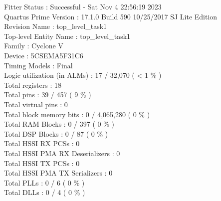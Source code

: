\documentclass[11pt, titlepage]{article}
\begin{document}
\begin{description}
                    Fitter Status : Successful - Sat Nov  4 22:56:19 2023 \\
                    Quartus Prime Version : 17.1.0 Build 590 10/25/2017 SJ Lite Edition \\
                    Revision Name : top\_level\_task1 \\
                    Top-level Entity Name : top\_level\_task1 \\
                    Family : Cyclone V \\
                    Device : 5CSEMA5F31C6 \\
                    Timing Models : Final \\
                    Logic utilization (in ALMs) : 17 / 32,070 ( < 1 \% ) \\
                    Total registers : 18 \\
                    Total pins : 39 / 457 ( 9 \% ) \\
                    Total virtual pins : 0 \\
                    Total block memory bits : 0 / 4,065,280 ( 0 \% ) \\
                    Total RAM Blocks : 0 / 397 ( 0 \% ) \\
                    Total DSP Blocks : 0 / 87 ( 0 \% ) \\
                    Total HSSI RX PCSs : 0 \\
                    Total HSSI PMA RX Deserializers : 0 \\
                    Total HSSI TX PCSs : 0 \\
                    Total HSSI PMA TX Serializers : 0 \\
                    Total PLLs : 0 / 6 ( 0 \% ) \\
                    Total DLLs : 0 / 4 ( 0 \% )
                

\end{description}
\end{document}
